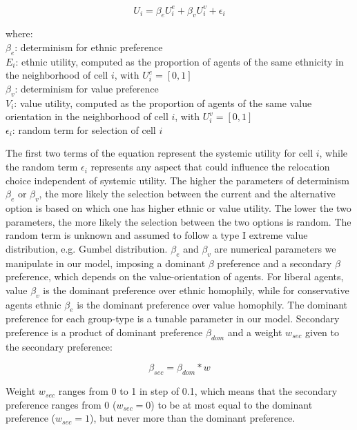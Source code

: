 \documentclass[
]{article}
\begin{document}
\begin{equation}\label{eq:utot}
U_{i} = \beta_{e}U^{e}_{i} + \beta_{v}U^{v}_{i} +  \epsilon_{i}
\end{equation}

where:\\
$\beta_{e}$: determinism for ethnic preference\\
$E_{i}$: ethnic utility, computed as the proportion of agents of the same ethnicity in the neighborhood of cell $i$, with $U^{e}_{i}=[0,1]$ \\
$\beta_{v}$: determinism for value preference \\
$V_{i}$: value utility, computed as the proportion of agents of the same value orientation in the neighborhood of cell $i$, with $U^{v}_{i}=[0,1]$ \\
$\epsilon_{i}$: random term for selection of cell $i$\newline


The first two terms of the equation represent the systemic utility for cell $i$, while the random term $\epsilon_{i}$ represents any aspect that could influence the relocation choice independent of systemic utility. The higher the parameters of determinism $\beta_{e}$ or $\beta_{v}$, the more likely the selection between the current and the alternative option is based on which one has higher ethnic or value utility. The lower the two parameters, the more likely the selection between the two options is random. The random term is unknown and assumed to follow a type I extreme value distribution, e.g. Gumbel distribution. $\beta_{e}$ and $\beta_{v}$ are numerical parameters we manipulate in our model, imposing a dominant $\beta$ preference and a secondary $\beta$ preference, which depends on the value-orientation of agents. For liberal agents, value $\beta_{v}$ is the dominant preference over ethnic homophily, while for conservative agents ethnic $\beta_{e}$ is the dominant preference over value homophily. The dominant preference for each group-type is a tunable parameter in our model. Secondary preference is a product of dominant preference $\beta_{dom}$ and a weight $w_{sec}$ given to the secondary preference:

\begin{equation}\label{sec}
    \beta_{sec} = \beta_{dom} * w
\end{equation}

Weight $w_{sec}$ ranges from 0 to 1 in step of 0.1, which means that the secondary preference ranges from 0 ($w_{sec} = 0$) to be at most equal to the dominant preference ($w_{sec} = 1$), but never more than the dominant preference.\newline
\end{document}
